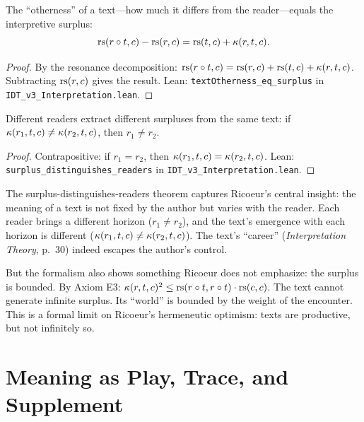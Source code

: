 \begin{theorem}
\label{thm:text-otherness}
The ``otherness'' of a text---how much it differs from the reader---equals
the interpretive surplus:
\[
\mathrm{rs}(r \circ t, c) - \mathrm{rs}(r, c) = \mathrm{rs}(t, c) + \kappa(r, t, c).
\]
\end{theorem}

\begin{proof}
By the resonance decomposition: $\mathrm{rs}(r \circ t, c) = \mathrm{rs}(r, c) + \mathrm{rs}(t, c)
+ \kappa(r, t, c)$. Subtracting $\mathrm{rs}(r, c)$ gives the result.
Lean: \texttt{textOtherness\_eq\_surplus} in
\texttt{IDT\_v3\_Interpretation.lean}.
\end{proof}

\begin{theorem}
\label{thm:surplus-readers}
Different readers extract different surpluses from the same text:
if $\kappa(r_1, t, c) \neq \kappa(r_2, t, c)$, then $r_1 \neq r_2$.
\end{theorem}

\begin{proof}
Contrapositive: if $r_1 = r_2$, then $\kappa(r_1, t, c) = \kappa(r_2, t, c)$.
Lean: \texttt{surplus\_distinguishes\_readers} in
\texttt{IDT\_v3\_Interpretation.lean}.
\end{proof}

\begin{interpretation}
The surplus-distinguishes-readers theorem captures Ricoeur's central insight:
the meaning of a text is not fixed by the author but varies with the reader.
Each reader brings a different horizon ($r_1 \neq r_2$), and the text's
emergence with each horizon is different ($\kappa(r_1, t, c) \neq
\kappa(r_2, t, c)$). The text's ``career'' (\textit{Interpretation Theory},
p.~30) indeed escapes the author's control.

But the formalism also shows something Ricoeur does not emphasize: the
surplus is bounded. By Axiom E3:
$\kappa(r, t, c)^2 \leq \mathrm{rs}(r \circ t, r \circ t) \cdot \mathrm{rs}(c, c)$.
The text cannot generate infinite surplus. Its ``world'' is bounded by the
weight of the encounter. This is a formal limit on Ricoeur's hermeneutic
optimism: texts are productive, but not infinitely so.
\end{interpretation}

\section{Meaning as Play, Trace, and Supplement}

